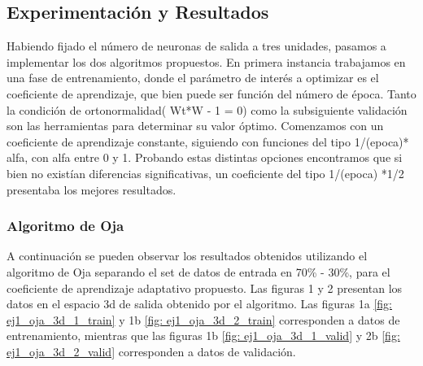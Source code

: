 \subsection{Experimentación y Resultados}

\par Habiendo fijado el número de neuronas de salida a tres unidades, pasamos a implementar los dos algoritmos propuestos. En primera instancia trabajamos en una fase de entrenamiento, donde el parámetro de interés a optimizar es el coeficiente de aprendizaje, que bien puede ser función del número de época. Tanto la condición de ortonormalidad( Wt*W - 1 = 0) como la subsiguiente validación son las herramientas para determinar su valor óptimo. Comenzamos con un coeficiente de aprendizaje constante, siguiendo con funciones del tipo 1/(epoca)* alfa, con alfa entre 0 y 1. Probando estas distintas opciones encontramos que si bien no existían diferencias significativas, un coeficiente del tipo 1/(epoca) *1/2 presentaba los mejores resultados.

\subsubsection{Algoritmo de Oja}

\par  A continuación se pueden observar los resultados obtenidos utilizando el algoritmo de Oja separando el set de datos de entrada en 70\% - 30\%, para el coeficiente de aprendizaje adaptativo propuesto. Las figuras 1 y 2 presentan los datos en el espacio 3d de salida obtenido por el algoritmo. Las figuras 1a \ref{fig: ej1_oja_3d_1_train} y 1b \ref{fig: ej1_oja_3d_2_train} corresponden a datos de entrenamiento, mientras que las figuras 1b \ref{fig: ej1_oja_3d_1_valid} y 2b  \ref{fig: ej1_oja_3d_2_valid} corresponden a datos de validación. 


